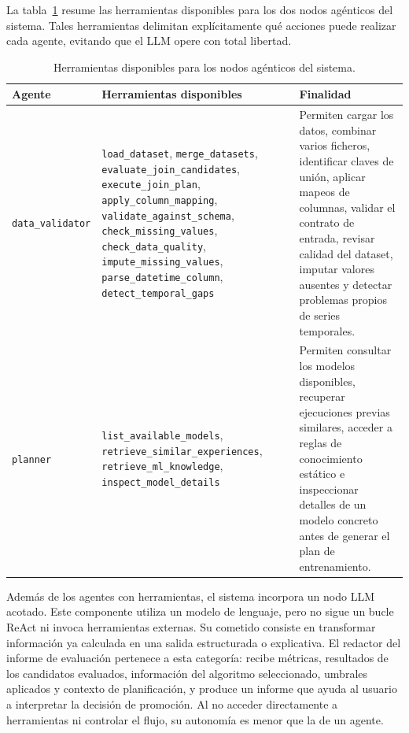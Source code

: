 \documentclass[12pt,a4paper]{article}
\theoremstyle{plain}
\begin{document}
La tabla~\ref{tab:tools-agentes} resume las herramientas disponibles para los dos nodos agénticos del sistema. Tales herramientas delimitan explícitamente qué acciones puede realizar cada agente, evitando que el LLM opere con total libertad.

\begin{table}[H]
\centering
\footnotesize
\setlength{\tabcolsep}{4pt}
\renewcommand{\arraystretch}{1.05}
\begin{tabularx}{\linewidth}{>{\RaggedRight\arraybackslash}p{3.0cm} >{\RaggedRight\arraybackslash}X >{\RaggedRight\arraybackslash}X}
\hline
\textbf{Agente} & \textbf{Herramientas disponibles} & \textbf{Finalidad} \\\hline
\texttt{data\_validator} & \texttt{load\_dataset}, \texttt{merge\_datasets}, \texttt{evaluate\_join\_candidates}, \texttt{execute\_join\_plan}, \texttt{apply\_column\_mapping}, \texttt{validate\_against\_schema}, \texttt{check\_missing\_values}, \texttt{check\_data\_quality}, \texttt{impute\_missing\_values}, \texttt{parse\_datetime\_column}, \texttt{detect\_temporal\_gaps} & Permiten cargar los datos, combinar varios ficheros, identificar claves de unión, aplicar mapeos de columnas, validar el contrato de entrada, revisar calidad del dataset, imputar valores ausentes y detectar problemas propios de series temporales. \\\hline
\texttt{planner} & \texttt{list\_available\_models}, \texttt{retrieve\_similar\_experiences}, \texttt{retrieve\_ml\_knowledge}, \texttt{inspect\_model\_details} & Permiten consultar los modelos disponibles, recuperar ejecuciones previas similares, acceder a reglas de conocimiento estático e inspeccionar detalles de un modelo concreto antes de generar el plan de entrenamiento. \\\hline
\end{tabularx}
\caption{Herramientas disponibles para los nodos agénticos del sistema.}
\label{tab:tools-agentes}
\end{table}

Además de los agentes con herramientas, el sistema incorpora un nodo LLM acotado. Este componente utiliza un modelo de lenguaje, pero no sigue un bucle ReAct ni invoca herramientas externas. Su cometido consiste en transformar información ya calculada en una salida estructurada o explicativa. El redactor del informe de evaluación pertenece a esta categoría: recibe métricas, resultados de los candidatos evaluados, información del algoritmo seleccionado, umbrales aplicados y contexto de planificación, y produce un informe que ayuda al usuario a interpretar la decisión de promoción. Al no acceder directamente a herramientas ni controlar el flujo, su autonomía es menor que la de un agente.
\end{document}
